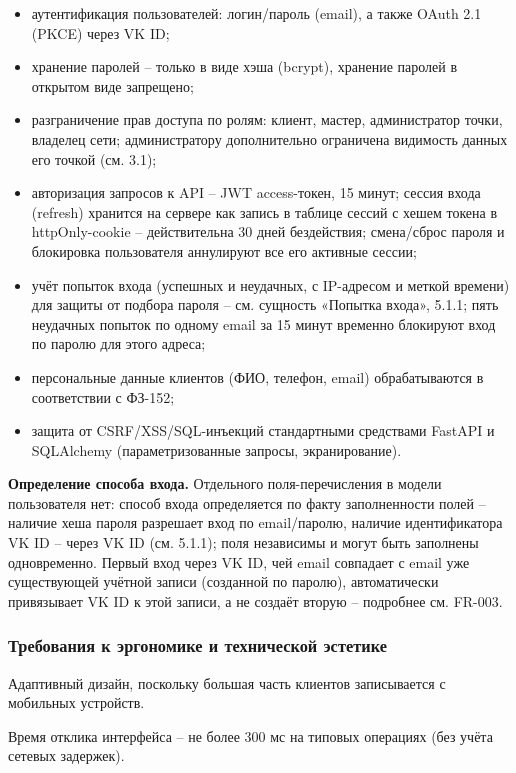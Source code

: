 \begin{itemize}
  \item аутентификация пользователей: логин/пароль (email), а также OAuth 2.1 (PKCE) через VK ID;
  \item хранение паролей -- только в виде хэша (bcrypt), хранение паролей в открытом виде запрещено;
  \item разграничение прав доступа по ролям: клиент, мастер, администратор точки, владелец сети; администратору дополнительно ограничена видимость данных его точкой (см. 3.1);
  \item авторизация запросов к API -- JWT access-токен, 15 минут; сессия входа (refresh) хранится на сервере как запись в таблице сессий с хешем токена в httpOnly-cookie -- действительна 30 дней бездействия; смена/сброс пароля и блокировка пользователя аннулируют все его активные сессии;
  \item учёт попыток входа (успешных и неудачных, с IP-адресом и меткой времени) для защиты от подбора пароля -- см. сущность «Попытка входа», 5.1.1; пять неудачных попыток по одному email за 15 минут временно блокируют вход по паролю для этого адреса;
  \item персональные данные клиентов (ФИО, телефон, email) обрабатываются в соответствии с ФЗ-152;
  \item защита от CSRF/XSS/SQL-инъекций стандартными средствами FastAPI и SQLAlchemy (параметризованные запросы, экранирование).
\end{itemize}

\textbf{Определение способа входа.} Отдельного поля-перечисления в модели пользователя нет: способ входа определяется по факту заполненности полей -- наличие хеша пароля разрешает вход по email/паролю, наличие идентификатора VK ID -- через VK ID (см. 5.1.1); поля независимы и могут быть заполнены одновременно. Первый вход через VK ID, чей email совпадает с email уже существующей учётной записи (созданной по паролю), автоматически привязывает VK ID к этой записи, а не создаёт вторую -- подробнее см. FR-003.

\subsubsection{Требования к эргономике и технической эстетике}

Адаптивный дизайн, поскольку большая часть клиентов записывается с мобильных устройств.

Время отклика интерфейса -- не более 300 мс на типовых операциях (без учёта сетевых задержек).

